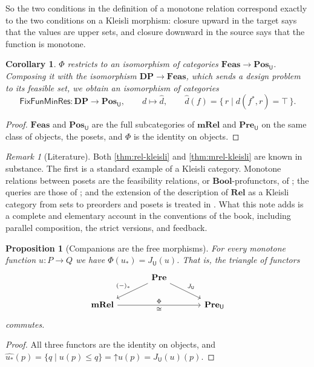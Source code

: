 \documentclass[11pt,a4paper]{article}
\theoremstyle{plain}
\newtheorem{proposition}[theorem]{Proposition}
\newtheorem{corollary}[theorem]{Corollary}
\theoremstyle{definition}
\theoremstyle{remark}
\newtheorem{remark}[theorem]{Remark}
\newcommand{\Cat}[1]{\mathbf{#1}}
\newcommand{\Rel}{\Cat{Rel}}
\newcommand{\Pre}{\Cat{Pre}}
\newcommand{\Pos}{\Cat{Pos}}
\newcommand{\mRel}{\Cat{mRel}}
\newcommand{\Feas}{\Cat{Feas}}
\newcommand{\DP}{\Cat{DP}}
\newcommand{\Bool}{\Cat{Bool}}
\newcommand{\U}{\mathsf{U}}
\newcommand{\PreU}{\Pre_{\U}}
\newcommand{\PosU}{\Pos_{\U}}
\newcommand{\up}{\mathord{\uparrow}}
\newcommand{\Fix}{\mathsf{FixFunMinRes}}
\newcommand{\comp}[1]{#1_{*}}
\begin{document}
So the two conditions in the definition of a monotone relation correspond exactly to the two conditions on a Kleisli morphism: closure upward in the target says that the values are upper sets, and closure downward in the source says that the function is monotone.

\begin{corollary}
    \label{cor:feas-posU}
    $\Phi$ restricts to an isomorphism of categories $\Feas \to \PosU$.
    Composing it with the isomorphism $\DP \to \Feas$, which sends a design problem to its feasible set, we obtain an isomorphism of categories
    \begin{equation*}
        \Fix \colon \DP \to \PosU,
        \qquad
        d \mapsto \widehat{d},
        \qquad
        \widehat{d}(f) = \{\, r \mid d(f^*, r) = \top \,\}.
    \end{equation*}
\end{corollary}
\begin{proof}
    $\Feas$ and $\PosU$ are the full subcategories of $\mRel$ and $\PreU$ on the same class of objects, the posets, and $\Phi$ is the identity on objects.
\end{proof}

\begin{remark}[Literature]
    Both \cref{thm:rel-kleisli} and \cref{thm:mrel-kleisli} are known in substance.
    The first is a standard example of a Kleisli category.
    Monotone relations between posets are the feasibility relations, or $\Bool$-profunctors, of \cite[Chapter 4]{fong-spivak}; the queries are those of \cite{censi}; and the extension of the description of $\Rel$ as a Kleisli category from sets to preorders and posets is treated in \cite{bkpv}.
    What this note adds is a complete and elementary account in the conventions of the book, including parallel composition, the strict versions, and feedback.
\end{remark}

\begin{proposition}[Companions are the free morphisms]
    \label{prop:companion-free}
    For every monotone function $u \colon P \to Q$ we have $\Phi(\comp{u}) = J_{\U}(u)$.
    That is, the triangle of functors
    \begin{equation*}
        \begin{tikzcd}[column sep=large]
            & \Pre \arrow[dl, "\comp{(-)}"'] \arrow[dr, "J_{\U}"] & \\
            \mRel \arrow[rr, "\Phi", "\cong"'] & & \PreU
        \end{tikzcd}
    \end{equation*}
    commutes.
\end{proposition}
\begin{proof}
    All three functors are the identity on objects, and $\widehat{\comp{u}}(p) = \{ q \mid u(p) \leq q \} = \up u(p) = J_{\U}(u)(p)$.
\end{proof}
\end{document}
